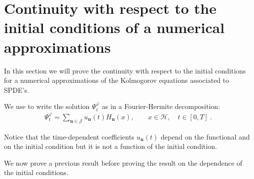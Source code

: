 \documentclass[review, onefignum, onetabnum]{siamart171218}
\begin{document}
\section{Continuity with respect to the initial conditions of a numerical
approximations }


In this section we will prove the continuity with respect to the initial
conditions for a numerical approximations
of the Kolmogorov equations associated to SPDE's.

We use  to write the solution $\Psi_t^\varphi$ as in a
Fourier-Hermite decomposition:
\begin{align}
    \Psi_t ^ \varphi=
        \sum_{\bm{n}\in \mathcal{J}}
        u_{\bm{n}}(t) H_{\bm{n}}(x),
        \qquad
        x \in \mathcal{H},
        \quad t \in [0,T] \ .
        \label{num-approx}
\end{align}

Notice that the time-dependent coefficients $ u_{\bm{n}}(t)$ depend on the
functional and on the initial condition but it is not a function of
the initial condition.

We now prove a previous result before proving the result on the dependence of
the initial conditions.
\end{document}
